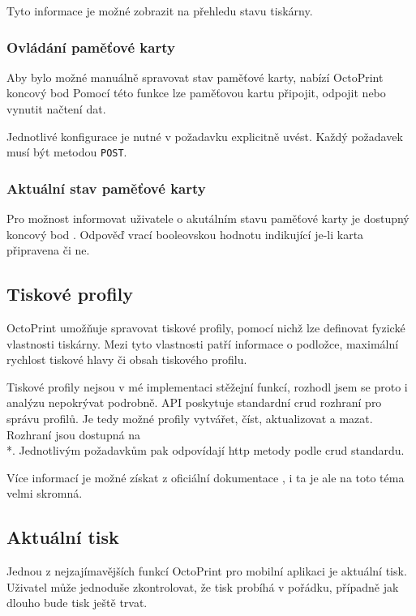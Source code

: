 Tyto informace je možné zobrazit na přehledu stavu tiskárny.

\subsubsection*{Ovládání paměťové karty}

Aby bylo možné manuálně spravovat stav paměťové karty, nabízí OctoPrint koncový bod 
Pomocí této funkce lze paměťovou kartu připojit, odpojit nebo vynutit načtení dat.

Jednotlivé konfigurace je nutné v požadavku explicitně uvést.
Každý požadavek musí být metodou \texttt{POST}.

\subsubsection*{Aktuální stav paměťové karty}

Pro možnost informovat uživatele o akutálním stavu paměťové karty je dostupný koncový bod .
Odpověď vrací booleovskou hodnotu indikující je-li karta připravena či ne.

\subsection{Tiskové profily}

OctoPrint umožňuje spravovat tiskové profily, pomocí nichž lze definovat fyzické vlastnosti tiskárny.
Mezi tyto vlastnosti patří informace o podložce, maximální rychlost tiskové hlavy či obsah tiskového profilu.

Tiskové profily nejsou v mé implementaci stěžejní funkcí, rozhodl jsem se proto i analýzu nepokrývat podrobně.
API poskytuje standardní \acrfull{crud} rozhraní pro správu profilů.
Je tedy možné profily vytvářet, číst, aktualizovat a mazat.
Rozhraní jsou dostupná na\\*.
Jednotlivým požadavkům pak odpovídají \acrshort{http} metody podle \acrshort{crud} standardu.

Více informací je možné získat z oficiální dokumentace \cite{octoprint-docs-printer-profiles}, i ta je ale na toto téma velmi skromná.

\subsection{Aktuální tisk}

Jednou z nejzajímavějších funkcí OctoPrint pro mobilní aplikaci je aktuální tisk.
Uživatel může jednoduše zkontrolovat, že tisk probíhá v pořádku, případně jak dlouho bude tisk ještě trvat.

